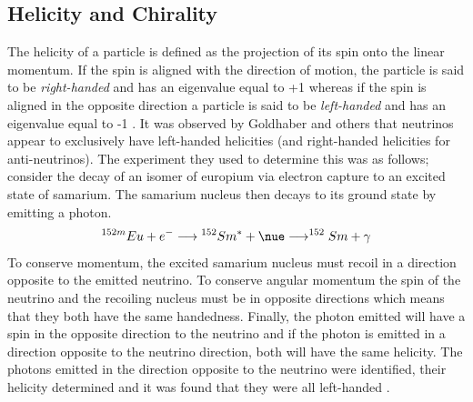 \subsection{Helicity and Chirality}
The helicity of a particle is defined as the projection of its spin onto the linear momentum.  If the spin is aligned with the direction of motion, the particle is said to be \textit{right-handed} and has an eigenvalue equal to +1 whereas if the spin is aligned in the opposite direction a particle is said to be \textit{left-handed} and has an eigenvalue equal to -1 \cite{MartinandShaw}. It was observed by Goldhaber and others that neutrinos appear to exclusively have left-handed helicities (and right-handed helicities for anti-neutrinos). The experiment they used to determine this was as follows; consider the decay of an isomer of europium via electron capture to an excited state of samarium. The samarium nucleus then decays to its ground state by emitting a photon. 
\begin{equation}
    ^{152m}Eu + e^- \longrightarrow {^{152}Sm^*} + \nue \longrightarrow ^{152}Sm + \gamma
\end{equation}
To conserve momentum, the excited samarium nucleus must recoil in a direction opposite to the emitted neutrino. To conserve angular momentum the spin of the neutrino and the recoiling nucleus must be in opposite directions which means that they both have the same handedness. Finally, the photon emitted will have a spin in the opposite direction to the neutrino and if the photon is emitted in a direction opposite to the neutrino direction, both will have the same helicity. The photons emitted in the direction opposite to the neutrino were identified, their helicity determined and it was found that they were all left-handed \cite{Goldhaber_experiment}. 

